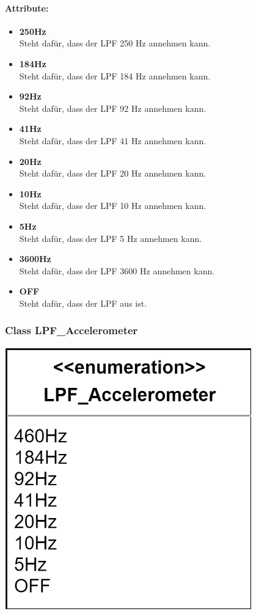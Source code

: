 \documentclass[a4paper,12pt]{article}
\begin{document}
\paragraph{Attribute:}
\begin{itemize}
	\item \textbf{250Hz}\\Steht dafür, dass der LPF 250 Hz annehmen kann.
	\item \textbf{184Hz}\\Steht dafür, dass der LPF 184 Hz annehmen kann.
	\item \textbf{92Hz}\\Steht dafür, dass der LPF 92 Hz annehmen kann.
	\item \textbf{41Hz}\\Steht dafür, dass der LPF 41 Hz annehmen kann.
	\item \textbf{20Hz}\\Steht dafür, dass der LPF 20 Hz annehmen kann.
	\item \textbf{10Hz}\\Steht dafür, dass der LPF 10 Hz annehmen kann.
	\item \textbf{5Hz}\\Steht dafür, dass der LPF 5 Hz annehmen kann.
	\item \textbf{3600Hz}\\Steht dafür, dass der LPF 3600 Hz annehmen kann.
	\item \textbf{OFF}\\Steht dafür, dass der LPF aus ist.
\end{itemize}


\begin{minipage}[b]{0.5\textwidth}
	\subsubsection{Class LPF\_Accelerometer}
	
	\end{minipage}
	\begin{minipage}[c]{0.5\textwidth}
	\includegraphics[width=0.8\textwidth]{bilder/BibPackageKlassen/LPF_Accelerometer.png}
\end{minipage}
\end{document}
